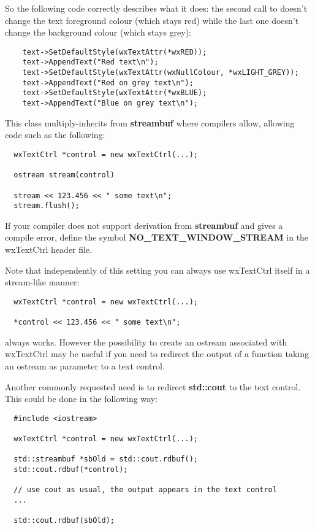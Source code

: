 So the following code correctly describes what it does: the second call
to  doesn't change the
text foreground colour (which stays red) while the last one doesn't change the
background colour (which stays grey):

{\small%
\begin{verbatim}
    text->SetDefaultStyle(wxTextAttr(*wxRED));
    text->AppendText("Red text\n");
    text->SetDefaultStyle(wxTextAttr(wxNullColour, *wxLIGHT_GREY));
    text->AppendText("Red on grey text\n");
    text->SetDefaultStyle(wxTextAttr(*wxBLUE);
    text->AppendText("Blue on grey text\n");
\end{verbatim}
}%


This class multiply-inherits from {\bf streambuf} where compilers allow,
allowing code such as the following:

{\small%
\begin{verbatim}
  wxTextCtrl *control = new wxTextCtrl(...);

  ostream stream(control)

  stream << 123.456 << " some text\n";
  stream.flush();
\end{verbatim}
}%

If your compiler does not support derivation from {\bf streambuf} and gives a
compile error, define the symbol {\bf NO\_TEXT\_WINDOW\_STREAM} in the
wxTextCtrl header file.

Note that independently of this setting you can always use wxTextCtrl itself
in a stream-like manner:

{\small%
\begin{verbatim}
  wxTextCtrl *control = new wxTextCtrl(...);

  *control << 123.456 << " some text\n";
\end{verbatim}
}%

always works. However the possibility to create an ostream associated with
wxTextCtrl may be useful if you need to redirect the output of a function
taking an ostream as parameter to a text control.

Another commonly requested need is to redirect {\bf std::cout} to the text
control. This could be done in the following way:

{\small%
\begin{verbatim}
  #include <iostream>

  wxTextCtrl *control = new wxTextCtrl(...);

  std::streambuf *sbOld = std::cout.rdbuf();
  std::cout.rdbuf(*control);

  // use cout as usual, the output appears in the text control
  ...

  std::cout.rdbuf(sbOld);
\end{verbatim}
}%

